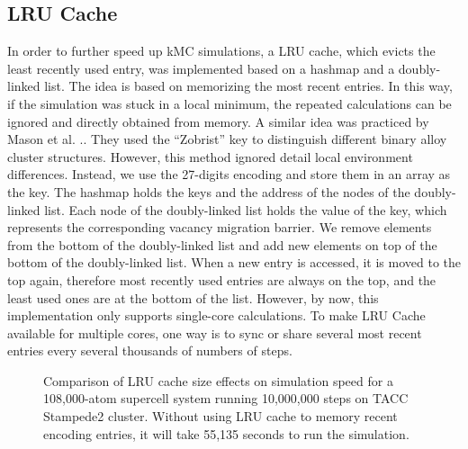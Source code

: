 \subsection{\acf{LRU} Cache}
\label{Chap:Al/Vac:sec:LRU}
In order to further speed up \ac{kMC} simulations, a \acf{LRU} cache, which evicts the least recently used entry, was implemented based on a hashmap and a  doubly-linked list. The idea is based on memorizing the most recent entries. In this way, if the simulation was stuck in a local minimum, the repeated calculations can be ignored and directly obtained from memory. A similar idea was practiced by Mason et al. .\cite{mason2005fast}. They used the ``Zobrist'' key to distinguish different binary alloy cluster structures. However, this method ignored detail local environment differences. Instead, we use the 27-digits encoding and store them in an array as the key. The hashmap holds the keys and the address of the nodes of the doubly-linked list. Each node of the doubly-linked list holds the value of the key, which represents the corresponding vacancy migration barrier. We remove elements from the bottom of the doubly-linked list and add new elements on top of the bottom of the doubly-linked list. When a new entry is accessed, it is moved to the top again, therefore most recently used entries are always on the top, and the least used ones are at the bottom of the list. However, by now, this implementation only supports single-core calculations. To make \ac{LRU} Cache available for multiple cores, one way is to sync or share several most recent entries every several thousands of numbers of steps.

\begingroup
\begin{figure}[!ht]
  \centering
\caption[Comparison of \acs{LRU} cache size effects on simulation speed for a 108,000-atom supercell system running 10,000,000 steps on TACC Stampede2 cluster.]{Comparison of \acs{LRU} cache size effects on simulation speed for a 108,000-atom supercell system running 10,000,000 steps on TACC Stampede2 cluster. Without using \ac{LRU} cache to memory recent encoding entries, it will take 55,135 seconds to run the simulation.}
\label{Chap:Al/Vac:fig:lru_size}
\end{figure}
\endgroup


